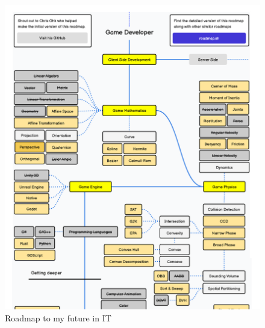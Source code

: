 \documentclass{article}
\begin{document}
\begin{figure}[H]
    \centering
    \includegraphics[width=\textwidth]{images/roadmap.png}
    \caption{Roadmap to my future in IT}
    \label{fig:roadmap}
\end{figure}
\end{document}
